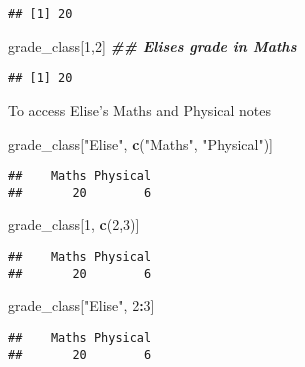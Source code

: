 \documentclass[
]{article}
\newenvironment{Shaded}{\begin{snugshade}}{\end{snugshade}}
\newcommand{\DecValTok}[1]{\textcolor[rgb]{0.00,0.00,0.81}{#1}}
\newcommand{\DocumentationTok}[1]{\textcolor[rgb]{0.56,0.35,0.01}{\textbf{\textit{#1}}}}
\newcommand{\FunctionTok}[1]{\textcolor[rgb]{0.13,0.29,0.53}{\textbf{#1}}}
\newcommand{\NormalTok}[1]{#1}
\newcommand{\SpecialCharTok}[1]{\textcolor[rgb]{0.81,0.36,0.00}{\textbf{#1}}}
\newcommand{\StringTok}[1]{\textcolor[rgb]{0.31,0.60,0.02}{#1}}
\begin{document}
\begin{verbatim}
## [1] 20
\end{verbatim}

\begin{Shaded}
\begin{Highlighting}[]
\NormalTok{grade\_class[}\DecValTok{1}\NormalTok{,}\DecValTok{2}\NormalTok{] }\DocumentationTok{\#\# Elise\textquotesingle{}s grade in Maths}
\end{Highlighting}
\end{Shaded}

\begin{verbatim}
## [1] 20
\end{verbatim}

To access Elise's Maths and Physical notes

\begin{Shaded}
\begin{Highlighting}[]
\NormalTok{grade\_class[}\StringTok{"Elise"}\NormalTok{, }\FunctionTok{c}\NormalTok{(}\StringTok{"Maths"}\NormalTok{, }\StringTok{"Physical"}\NormalTok{)]}
\end{Highlighting}
\end{Shaded}

\begin{verbatim}
##    Maths Physical 
##       20        6
\end{verbatim}

\begin{Shaded}
\begin{Highlighting}[]
\NormalTok{grade\_class[}\DecValTok{1}\NormalTok{, }\FunctionTok{c}\NormalTok{(}\DecValTok{2}\NormalTok{,}\DecValTok{3}\NormalTok{)]}
\end{Highlighting}
\end{Shaded}

\begin{verbatim}
##    Maths Physical 
##       20        6
\end{verbatim}

\begin{Shaded}
\begin{Highlighting}[]
\NormalTok{grade\_class[}\StringTok{"Elise"}\NormalTok{, }\DecValTok{2}\SpecialCharTok{:}\DecValTok{3}\NormalTok{]}
\end{Highlighting}
\end{Shaded}

\begin{verbatim}
##    Maths Physical 
##       20        6
\end{verbatim}
\end{document}
